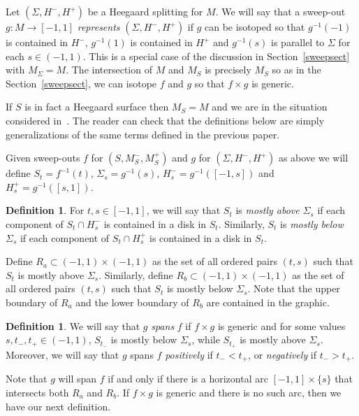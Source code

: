 \documentclass[12pt]{amsart}
\theoremstyle{plain}
\theoremstyle{definition}
\newtheorem{Def}[Thm]{Definition}
\begin{document}
Let $(\Sigma, H^-, H^+)$ be a Heegaard splitting for $M$.  We will say that a sweep-out $g : M \rightarrow [-1,1]$ \textit{represents} $(\Sigma, H^-, H^+)$ if $g$ can be isotoped so that $g^{-1}(-1)$ is contained in $H^-$, $g^{-1}(1)$ is contained in $H^+$ and $g^{-1}(s)$ is parallel to $\Sigma$ for each $s \in (-1,1)$.  This is a special case of the discussion in Section~\ref{sweepsect} with $M_\Sigma = M$.  The intersection of $M$ and $M_S$ is precisely $M_S$ so as in the Section~\ref{sweepsect}, we can isotope $f$ and $g$ so that $f \times g$ is generic.

If $S$ is in fact a Heegaard surface then $M_S = M$ and we are in the situation considered in~\cite{me:stabs}.  The reader can check that the definitions below are simply generalizations of the same terms defined in the previous paper.

Given sweep-outs $f$ for $(S, M^-_S, M^+_S)$ and $g$ for $(\Sigma, H^-, H^+)$ as above we will define $S_t = f^{-1}(t)$, $\Sigma_s = g^{-1}(s)$, $H^-_s = g^{-1}([-1,s])$ and $H^+_s = g^{-1}([s,1])$.

\begin{Def}
For $t, s \in [-1,1]$, we will say that $S_t$ is \textit{mostly above} $\Sigma_s$ if each component of $S_t \cap H^-_s$ is contained in a disk in $S_t$.  Similarly, $S_t$ is \textit{mostly below} $\Sigma_s$ if each component of $S_t \cap H^+_s$ is contained in a disk in $S_t$.
\end{Def}

Define $R_a \subset (-1,1) \times (-1,1)$ as the set of all ordered pairs $(t,s)$ such that $S_t$ is mostly above $\Sigma_s$.  Similarly, define $R_b \subset (-1,1) \times (-1,1)$ as the set of all ordered pairs $(t,s)$ such that $S_t$ is mostly below $\Sigma_s$.  Note that the upper boundary of $R_a$ and the lower boundary of $R_b$ are contained in the graphic.

\begin{Def}
We will say that $g$ \textit{spans} $f$ if $f \times g$ is generic and for some values $s, t_-, t_+ \in (-1,1)$, $S_{t_-}$ is mostly below $\Sigma_s$, while $S_{t_+}$ is mostly above $\Sigma_s$.  Moreover, we will say that $g$ spans $f$ \textit{positively} if $t_- < t_+$, or \textit{negatively} if $t_- > t_+$.
\end{Def}

Note that $g$ will span $f$ if and only if there is a horizontal arc $[-1,1] \times \{s\}$ that intersects both $R_a$ and $R_b$.  If $f \times g$ is generic and there is no such arc, then we have our next definition.
\end{document}
